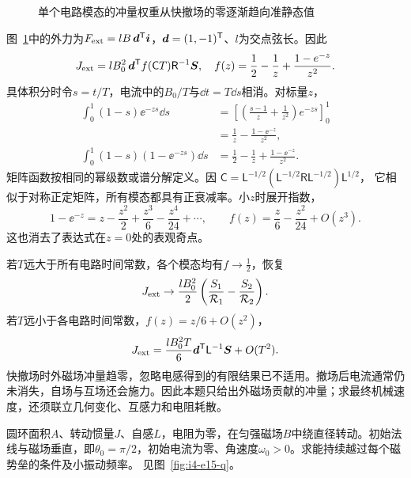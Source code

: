 \begin{solution}
\begin{figure}[H]
\begin{tikzpicture}[>=Stealth,line cap=round,line join=round]
\end{tikzpicture}
\caption{单个电路模态的冲量权重从快撤场的零逐渐趋向准静态值}\label{fig:i4-e14-s}
\end{figure}

图~\ref{fig:i4-e14-s}中的外力为$F_{\rm ext}=lB\,\bm{d}^{\mathsf T}\bm{i}$，$\bm{d}=(1,-1)^{\mathsf T}$、$l$为交点弦长。因此
\[
J_{\rm ext}=lB_0^2\,\bm{d}^{\mathsf T}
f(\mathsf CT)\mathsf R^{-1}\bm{S},\quad
f(z)=\frac12-\frac1z+\frac{1-e^{-z}}{z^2}.
\]
具体积分时令$s=t/T$，电流中的$B_0/T$与$\dd t=T\dd s$相消。对标量$z$，
\[
\begin{aligned}
\int_0^1(1-s)\ee^{-zs}\dd s
&=\left[\left(\frac{s-1}{z}+\frac1{z^2}\right)e^{-zs}\right]_0^1\\
&=\frac1z-\frac{1-\ee^{-z}}{z^2},\\
\int_0^1(1-s)(1-\ee^{-zs})\dd s
&=\frac12-\frac1z+\frac{1-\ee^{-z}}{z^2}.
\end{aligned}
\]
矩阵函数按相同的幂级数或谱分解定义。因
$\mathsf C=\mathsf L^{-1/2}(\mathsf L^{-1/2}\mathsf R\mathsf L^{-1/2})\mathsf L^{1/2}$，
它相似于对称正定矩阵，所有模态都具有正衰减率。小$z$时展开指数，
\[
1-\ee^{-z}=z-\frac{z^2}{2}+\frac{z^3}{6}-\frac{z^4}{24}+\cdots,\qquad
f(z)=\frac z6-\frac{z^2}{24}+O(z^3).
\]
这也消去了表达式在$z=0$处的表观奇点。

若$T$远大于所有电路时间常数，各个模态均有$f\to\tfrac12$，恢复
\[
J_{\rm ext}\to\frac{lB_0^2}{2}
\left(\frac{S_1}{\mathcal R_1}-\frac{S_2}{\mathcal R_2}\right).
\]
若$T$远小于各电路时间常数，$f(z)=z/6+O(z^2)$，
\[
J_{\rm ext}=\frac{lB_0^2T}{6}
\bm{d}^{\mathsf T}\mathsf L^{-1}\bm{S}+O(T^2).
\]
快撤场时外磁场冲量趋零，忽略电感得到的有限结果已不适用。撤场后电流通常仍未消失，自场与互场还会施力。因此本题只给出外磁场贡献的冲量；求最终机械速度，还须联立几何变化、互感力和电阻耗散。
\end{solution}

\begin{example}[无阻电感圆环的转动势垒]\label{ex:i4-e15}

圆环面积$A$、转动惯量$J$、自感$L$，电阻为零，在匀强磁场$B$中绕直径转动。初始法线与磁场垂直，即$\theta_0=\pi/2$，初始电流为零、角速度$\omega_0>0$。求能持续越过每个磁势垒的条件及小振动频率。
 见图~\ref{fig:i4-e15-q}。
\end{example}

